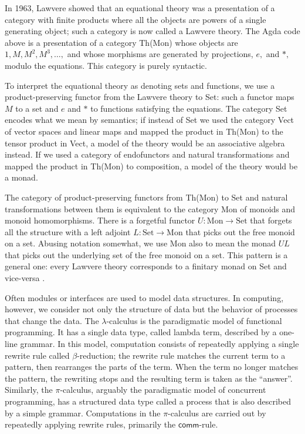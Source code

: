 \documentclass{llncs}
\newcommand{\maps}{\colon}
\newcommand{\Set}{\mathrm{Set}}
\newcommand{\Mon}{\mathrm{Mon}}
\begin{document}
  In 1963, Lawvere \cite{Lawvere} showed that an equational theory was
  a presentation of a category with finite products where all the
  objects are powers of a single generating object; such a category is
  now called a Lawvere theory.  The Agda code above is a presentation
  of a category Th(Mon) whose objects are $1, M, M^2, M^3, \ldots,$
  and whose morphisms are generated by projections, $e,$ and $*,$
  modulo the equations.  This category is purely syntactic.

  To interpret the equational theory as denoting sets and functions,
  we use a product-preserving functor from the Lawvere theory to Set:
  such a functor maps $M$ to a set and $e$ and $*$ to functions
  satisfying the equations.  The category Set encodes what we mean by
  semantics; if instead of Set we used the category Vect of vector
  spaces and linear maps and mapped the product in Th(Mon) to the
  tensor product in Vect, a model of the theory would be an
  associative algebra instead.  If we used a category of endofunctors
  and natural transformations and mapped the product in Th(Mon) to
  composition, a model of the theory would be a monad.

  The category of product-preserving functors from Th(Mon) to Set and
  natural transformations between them is equivalent to the category
  Mon of monoids and monoid homomorphisms.  There is a forgetful
  functor $U\maps \Mon \to \Set$ that forgets all the structure with a
  left adjoint $L\maps \Set \to \Mon$ that picks out the free monoid
  on a set.  Abusing notation somewhat, we use Mon also to mean the
  monad $UL$ that picks out the underlying set of the free monoid on a
  set.  This pattern is a general one: every Lawvere theory
  corresponds to a finitary monad on Set and vice-versa
  \cite{DBLP:journals/entcs/HylandP07}.

  Often modules or interfaces are used to model data structures.  In
  computing, however, we consider not only the structure of data but
  the behavior of processes that change the data.  The
  $\lambda$-calculus is the paradigmatic model of functional
  programming.  It has a single data type, called lambda term,
  described by a one-line grammar.  In this model, computation
  consists of repeatedly applying a single rewrite rule called
  $\beta$-reduction; the rewrite rule matches the current term to a
  pattern, then rearranges the parts of the term.  When the term no
  longer matches the pattern, the rewriting stops and the resulting
  term is taken as the ``answer''.  Similarly, the $\pi$-calculus,
  arguably the paradigmatic model of concurrent programming, has a
  structured data type called a process that is also described by a
  simple grammar.  Computations in the $\pi$-calculus are carried out
  by repeatedly applying rewrite rules, primarily the
  $\mathsf{comm}$-rule.
\end{document}
